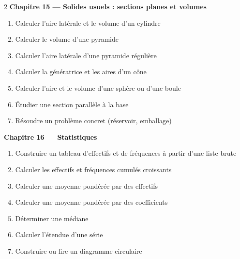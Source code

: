 \begin{multicols}{2}
\textbf{\normalsize\color{onbo}Chapitre 15 --- Solides usuels : sections planes et volumes}
\begin{enumerate}[label=\arabic*.,itemsep=1pt,topsep=2pt,leftmargin=1.6em]
\item Calculer l'aire latérale et le volume d'un cylindre
\item Calculer le volume d'une pyramide
\item Calculer l'aire latérale d'une pyramide régulière
\item Calculer la génératrice et les aires d'un cône
\item Calculer l'aire et le volume d'une sphère ou d'une boule
\item Étudier une section parallèle à la base
\item Résoudre un problème concret (réservoir, emballage)
\end{enumerate}
\vspace{4pt}

\textbf{\normalsize\color{onbo}Chapitre 16 --- Statistiques}
\begin{enumerate}[label=\arabic*.,itemsep=1pt,topsep=2pt,leftmargin=1.6em]
\item Construire un tableau d'effectifs et de fréquences à partir d'une liste brute
\item Calculer les effectifs et fréquences cumulés croissants
\item Calculer une moyenne pondérée par des effectifs
\item Calculer une moyenne pondérée par des coefficients
\item Déterminer une médiane
\item Calculer l'étendue d'une série
\item Construire ou lire un diagramme circulaire
\end{enumerate}
\vspace{4pt}

\end{multicols}
